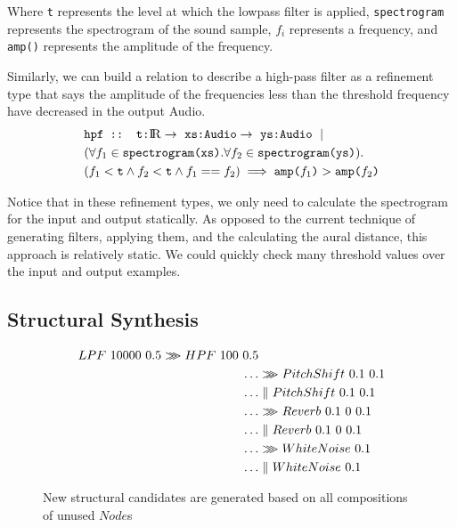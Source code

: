 Where \texttt{t} represents the level at which the lowpass filter is applied, \texttt{spectrogram} represents the spectrogram of the sound sample, $f_i$ represents a frequency, and \texttt{amp()} represents the amplitude of the frequency. 

Similarly, we can build a relation to describe a high-pass filter as a refinement type that says the amplitude of the frequencies less than the threshold frequency have decreased in the output Audio.
%
\begin{align*}
  &\texttt{hpf :: t:\reals} \to\ \texttt{xs:Audio} \to\ \texttt{ys:Audio}\ \mid \\
  &(\forall f_1 \in \texttt{spectrogram(xs)}. \forall f_2 \in \texttt{spectrogram(ys)}). \\
  &(f_1 < \texttt{t} \land f_2 < \texttt{t} \land f_1 == f_2) \implies \texttt{amp(}f_1\texttt{)} > \texttt{amp(} f_2 \texttt{)} 
\end{align*}

Notice that in these refinement types, we only need to calculate the spectrogram for the input and output statically.
As opposed to the current technique of generating filters, applying them, and the calculating the aural distance, this approach is relatively static.
We could quickly check many threshold values over the input and output examples.

\subsection{Structural Synthesis}

\begin{figure}
\begin{align*}
	LPF \ 10000 \ 0.5 \arrComp HPF \ 100 \ 0.5 & \\
	\ldots & \arrComp PitchShift \ 0.1 \ 0.1 \\
	\ldots & \parallelCompose PitchShift \ 0.1 \ 0.1 \\
	\ldots & \arrComp Reverb \ 0.1 \ 0 \ 0.1 \\
	\ldots & \parallelCompose Reverb \ 0.1 \ 0 \ 0.1 \\
	\ldots & \arrComp WhiteNoise \ 0.1 \\
	\ldots & \parallelCompose WhiteNoise \ 0.1
\end{align*}
\caption{New structural candidates are generated based on all compositions of unused $Node$s}
\label{fig:generation}
\end{figure}

